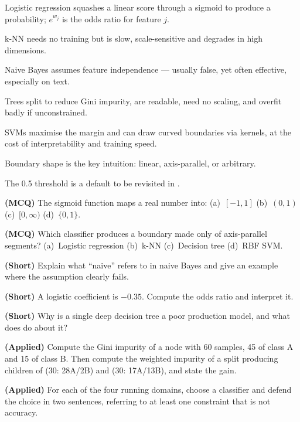 \begin{chaptersummary}
\begin{tight}
  \item Logistic regression squashes a linear score through a sigmoid to produce a
        probability; $e^{w_j}$ is the odds ratio for feature $j$.
  \item k-NN needs no training but is slow, scale-sensitive and degrades in high
        dimensions.
  \item Naive Bayes assumes feature independence --- usually false, yet often
        effective, especially on text.
  \item Trees split to reduce Gini impurity, are readable, need no scaling, and
        overfit badly if unconstrained.
  \item SVMs maximise the margin and can draw curved boundaries via kernels, at
        the cost of interpretability and training speed.
  \item Boundary shape is the key intuition: linear, axis-parallel, or arbitrary.
  \item The 0.5 threshold is a default to be revisited in .
\end{tight}
\end{chaptersummary}

\begin{reviewq}
  \item \textbf{(MCQ)} The sigmoid function maps a real number into:
        (a)~$[-1,1]$ (b)~$(0,1)$ (c)~$[0,\infty)$ (d)~$\{0,1\}$.
  \item \textbf{(MCQ)} Which classifier produces a boundary made only of
        axis-parallel segments? (a)~Logistic regression (b)~k-NN (c)~Decision tree
        (d)~RBF SVM.
  \item \textbf{(Short)} Explain what ``naive'' refers to in naive Bayes and give an
        example where the assumption clearly fails.
  \item \textbf{(Short)} A logistic coefficient is $-0.35$. Compute the odds ratio
        and interpret it.
  \item \textbf{(Short)} Why is a single deep decision tree a poor production model,
        and what does  do about it?
  \item \textbf{(Applied)} Compute the Gini impurity of a node with 60 samples, 45
        of class A and 15 of class B. Then compute the weighted impurity of a split
        producing children of (30: 28A/2B) and (30: 17A/13B), and state the gain.
  \item \textbf{(Applied)} For each of the four running domains, choose a classifier
        and defend the choice in two sentences, referring to at least one constraint
        that is not accuracy.
\end{reviewq}
